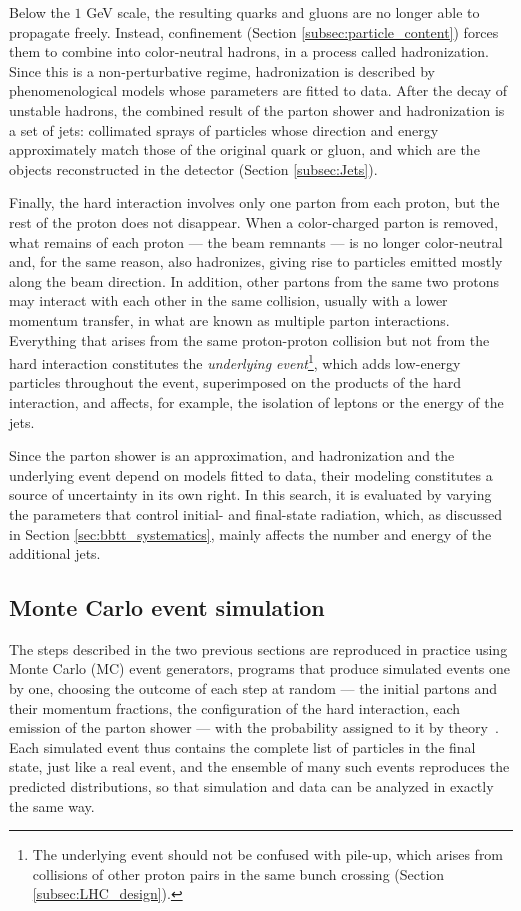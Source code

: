 Below the $1$ GeV scale, the resulting quarks and gluons are no longer able to propagate freely. Instead, confinement (Section \ref{subsec:particle_content}) forces them to combine into color-neutral hadrons, in a process called hadronization. Since this is a non-perturbative regime, hadronization is described by phenomenological models whose parameters are fitted to data. After the decay of unstable hadrons, the combined result of the parton shower and hadronization is a set of jets: collimated sprays of particles whose direction and energy approximately match those of the original quark or gluon, and which are the objects reconstructed in the detector (Section \ref{subsec:Jets}).

Finally, the hard interaction involves only one parton from each proton, but the rest of the proton does not disappear. When a color-charged parton is removed, what remains of each proton — the beam remnants — is no longer color-neutral and, for the same reason, also hadronizes, giving rise to particles emitted mostly along the beam direction. In addition, other partons from the same two protons may interact with each other in the same collision, usually with a lower momentum transfer, in what are known as multiple parton interactions. Everything that arises from the same proton-proton collision but not from the hard interaction constitutes the \textit{underlying event}\footnote{The underlying event should not be confused with pile-up, which arises from collisions of other proton pairs in the same bunch crossing (Section \ref{subsec:LHC_design}).}, which adds low-energy particles throughout the event, superimposed on the products of the hard interaction, and affects, for example, the isolation of leptons or the energy of the jets.


Since the parton shower is an approximation, and hadronization and the underlying event depend on models fitted to data, their modeling constitutes a source of uncertainty in its own right. In this search, it is evaluated by varying the parameters that control initial- and final-state radiation, which, as discussed in Section \ref{sec:bbtt_systematics}, mainly affects the number and energy of the additional jets.



\subsection{Monte Carlo event simulation}
\label{subsec:pp_simulation}
%
The steps described in the two previous sections are reproduced in practice using Monte Carlo (MC) event generators, programs that produce simulated events one by one, choosing the outcome of each step at random — the initial partons and their momentum fractions, the configuration of the hard interaction, each emission of the parton shower — with the probability assigned to it by theory~\cite{Buckley:2011ms}. Each simulated event thus contains the complete list of particles in the final state, just like a real event, and the ensemble of many such events reproduces the predicted distributions, so that simulation and data can be analyzed in exactly the same way.

